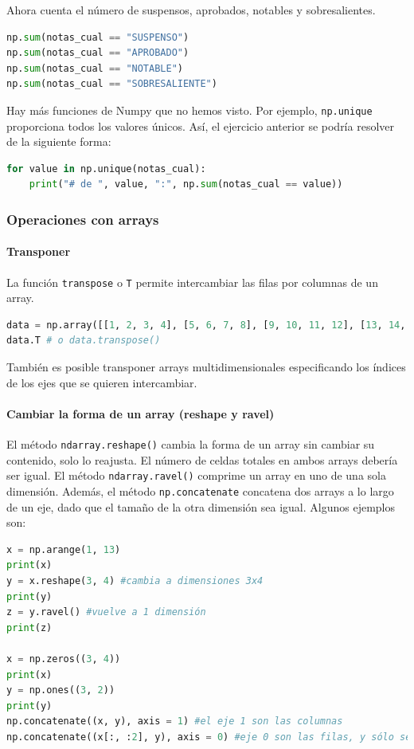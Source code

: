 Ahora cuenta el número de suspensos, aprobados, notables y sobresalientes.
\begin{lstlisting}[language=Python]
np.sum(notas_cual == "SUSPENSO")
np.sum(notas_cual == "APROBADO")
np.sum(notas_cual == "NOTABLE")
np.sum(notas_cual == "SOBRESALIENTE")
\end{lstlisting}

Hay más funciones de Numpy que no hemos visto. Por ejemplo, \texttt{np.unique} proporciona todos los valores únicos. Así, el ejercicio anterior se podría resolver de la siguiente forma:
\begin{lstlisting}[language=Python]
for value in np.unique(notas_cual):
    print("# de ", value, ":", np.sum(notas_cual == value))
\end{lstlisting}
\subsubsection{Operaciones con arrays}
\paragraph{Transponer}
La función \texttt{transpose} o \texttt{T} permite intercambiar las filas por columnas de un array. 
\begin{lstlisting}[language=Python]
data = np.array([[1, 2, 3, 4], [5, 6, 7, 8], [9, 10, 11, 12], [13, 14, 15, 16]])
data.T # o data.transpose()
\end{lstlisting}

También es posible transponer arrays multidimensionales especificando los índices de los ejes que se quieren intercambiar. 

\paragraph{Cambiar la forma de un array (reshape y ravel)}
El método \texttt{ndarray.reshape()} cambia la forma de un array sin cambiar su contenido, solo lo reajusta. El número de celdas totales en ambos arrays debería ser igual. El método \texttt{ndarray.ravel()} comprime un array en uno de una sola dimensión. Además, el método \texttt{np.concatenate} concatena dos arrays a lo largo de un eje, dado que el tamaño de la otra dimensión sea igual. Algunos ejemplos son:
\begin{lstlisting}[language=Python]
x = np.arange(1, 13) 
print(x)
y = x.reshape(3, 4) #cambia a dimensiones 3x4
print(y)
z = y.ravel() #vuelve a 1 dimensión
print(z)

x = np.zeros((3, 4))
print(x)
y = np.ones((3, 2))
print(y)
np.concatenate((x, y), axis = 1) #el eje 1 son las columnas
np.concatenate((x[:, :2], y), axis = 0) #eje 0 son las filas, y sólo se obtienen las primeras dos columnas de x
\end{lstlisting}

